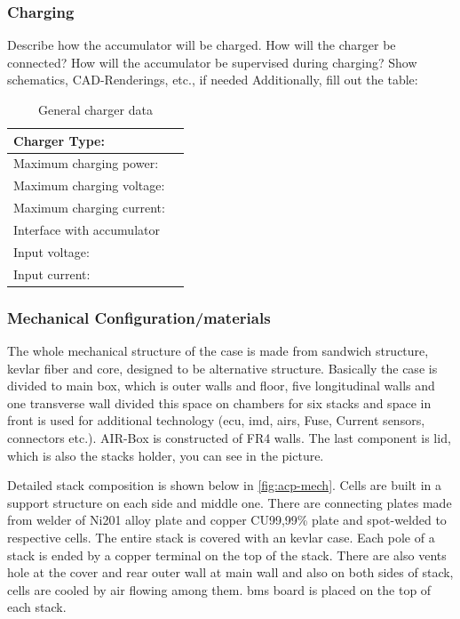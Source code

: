 \subsubsection{Charging}
Describe how the accumulator will be charged. How will the charger be connected? How will the accumulator be supervised during charging? Show schematics, CAD-Renderings, etc., if needed
Additionally, fill out the table:

\begin{table}[H]
	\centering
	\caption{General charger data}
	\begin{tabularx}{\textwidth}{|X|X|}
		\hline
		Charger Type: & \\[\TableSize]
		\hline
		Maximum charging power: &\\[\TableSize]
		\hline
		Maximum charging voltage: &  \\[\TableSize]
		\hline
		Maximum charging current: &  \\[\TableSize]
		\hline
		Interface with accumulator &  \\[\TableSize]
		\hline
		Input voltage: & \\[\TableSize]
		\hline
		Input current: &  \\[\TableSize]
		\hline
	\end{tabularx}%
	\label{tab:acc-charger}%
\end{table}%

\subsubsection{Mechanical Configuration/materials}

The whole mechanical structure of the case is made from sandwich structure, kevlar fiber and core, designed to be alternative structure. Basically the case is divided to main box, which is outer walls and floor, five longitudinal walls and one transverse wall divided this space on chambers for six stacks and space in front is used for additional technology (\gls{ecu}, \gls{imd}, \glspl{air}, Fuse, Current sensors, connectors etc.). AIR-Box is constructed of FR4 walls. The last component is lid, which is also the stacks holder, you can see in the picture.

Detailed stack composition is shown below in \ref{fig:acp-mech}. Cells are built in a support structure on each side and middle one. There are connecting plates made from welder of Ni201 alloy plate and copper CU99,99\% plate and spot-welded to respective cells. The entire stack is covered with an kevlar case. Each pole of a stack is ended by a copper terminal on the top of the stack. There are also vents hole at the cover and rear outer wall at main wall and also on both sides of stack, cells are cooled by air flowing among them. \gls{bms} board is placed on the top of each stack.

